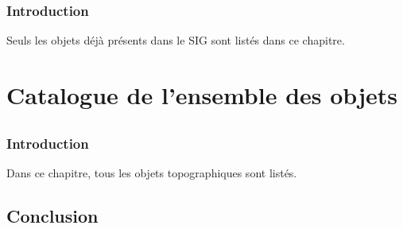 \documentclass[12pt,titlepage]{book}
\begin{document}
\section*{Introduction}
Seuls les objets déjà présents dans le SIG sont listés dans ce chapitre.


\part{Catalogue de l'ensemble des objets}

\chapter*{}
\section*{Introduction}
Dans ce chapitre, tous les objets topographiques sont listés.




\backmatter

\chapter{Conclusion}



\listoffigures
\end{document}
